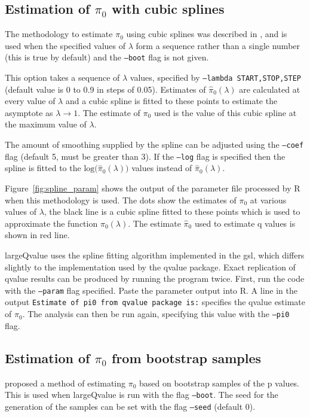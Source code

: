 \documentclass{amsart}
\begin{document}
\subsection{Estimation of $\pi_0$ with cubic splines}
\label{sec:spline}
The methodology to estimate $\pi_0$ using cubic splines was described in \citet{splinestorey}, and is used when the specified values of $\lambda$ form a sequence rather than a single number (this is true by default) and the \texttt{--boot} flag is not given.

This option takes a sequence of $\lambda$ values, specified by \texttt{--lambda START,STOP,STEP} (default value is 0 to 0.9 in steps of 0.05). Estimates of $\hat{\pi}_0(\lambda)$ are calculated at every value of $\lambda$ and a cubic spline is fitted to these points to estimate the asymptote as $\lambda\rightarrow1$. The estimate of $\pi_0$ used is the value of this cubic spline at the maximum value of $\lambda$.

The amount of smoothing supplied by the spline can be adjusted using the \texttt{--coef} flag (default 5, must be greater than 3). If the \texttt{--log} flag is specified then the spline is fitted to the $\text{log(}\hat{\pi}_0(\lambda))$ values instead of $\hat{\pi}_0(\lambda)$.

Figure~\ref{fig:spline_param} shows the output of the parameter file processed by R when this methodology is used. The dots show the estimates of $\pi_0$ at various values of $\lambda$, the black line is a cubic spline fitted to these points which is used to approximate the function $\pi_0(\lambda)$. The estimate $\hat{\pi}_0$ used to estimate q values is shown in red line.

largeQvalue uses the spline fitting algorithm implemented in the gsl, which differs slightly to the implementation used by the qvalue package. Exact replication of qvalue results can be produced by running the program twice. First, run the code with the \texttt{--param} flag specified. Paste the parameter output into R. A line in the output \texttt{Estimate of pi0 from qvalue package is:} specifies the qvalue estimate of $\pi_0$. The analysis can then be run again, specifying this value with the \texttt{--pi0} flag.

\subsection{Estimation of $\pi_0$ from bootstrap samples}
\label{sec:boot}
\citet{bootstorey} proposed a method of estimating $\pi_0$ based on bootstrap samples of the p values. This is used when largeQvalue is run with the flag \texttt{--boot}. The seed for the generation of the samples can be set with the flag \texttt{--seed} (default 0).
\end{document}
